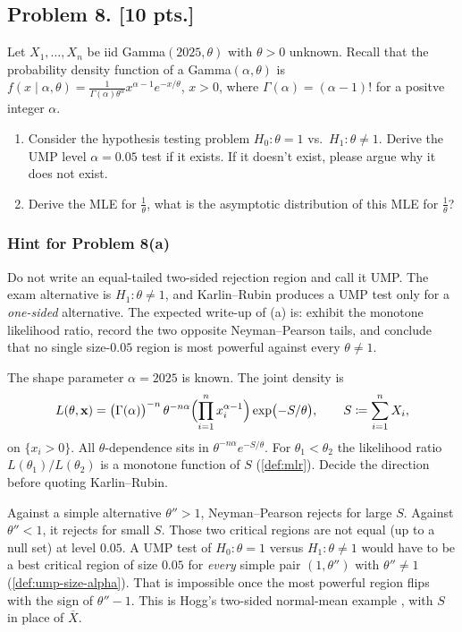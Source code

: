 \documentclass[11pt,a4paper]{article}
\begin{document}
\subsection{Problem 8. [10 pts.]}
Let \( X_1, \dots, X_n \) be iid Gamma\( (2025, \theta) \) with \( \theta > 0 \) unknown. Recall that the probability density function of a Gamma\( (\alpha, \theta) \) is \( f(x \mid \alpha, \theta) = \frac{1}{\Gamma(\alpha) \theta^\alpha} x^{\alpha-1} e^{-x/\theta} \), \( x > 0 \), where \( \Gamma(\alpha) = (\alpha - 1)! \) for a positve integer \( \alpha \).
\begin{enumerate}[label=(\alph*)]
    \item Consider the hypothesis testing problem \( H_0 : \theta = 1 \) vs.\ \( H_1 : \theta \neq 1 \). Derive the UMP level \( \alpha = 0.05 \) test if it exists. If it doesn't exist, please argue why it does not exist.
    \item Derive the MLE for \( \frac{1}{\theta} \), what is the asymptotic distribution of this MLE for \( \frac{1}{\theta} \)?
\end{enumerate}

\setcounter{section}{8}

\subsubsection{Hint for Problem 8(a)}

Do not write an equal-tailed two-sided rejection region and call it UMP. The exam alternative is \( H_1:\theta\neq 1 \), and Karlin--Rubin produces a UMP test only for a \emph{one-sided} alternative. The expected write-up of (a) is: exhibit the monotone likelihood ratio, record the two opposite Neyman--Pearson tails, and conclude that no single size-\( 0.05 \) region is most powerful against every \( \theta\neq 1 \).

The shape parameter \( \alpha=2025 \) is known. The joint density is
\[
L(\theta,\mathbf{x})
=
\bigl(\Gamma(\alpha)\bigr)^{-n}\,\theta^{-n\alpha}\Bigl(\prod_{i=1}^{n}x_i^{\alpha-1}\Bigr)\exp\bigl(-S/\theta\bigr),
\qquad
S
\coloneqq
\sum_{i=1}^{n}X_i,
\]
on \( \{x_i>0\} \). All \( \theta \)-dependence sits in \( \theta^{-n\alpha}e^{-S/\theta} \). For \( \theta_1<\theta_2 \) the likelihood ratio \( L(\theta_1)/L(\theta_2) \) is a monotone function of \( S \) (\cref{def:mlr}). Decide the direction before quoting Karlin--Rubin.

Against a simple alternative \( \theta''>1 \), Neyman--Pearson rejects for large \( S \). Against \( \theta''<1 \), it rejects for small \( S \). Those two critical regions are not equal (up to a null set) at level \( 0.05 \). A UMP test of \( H_0:\theta=1 \) versus \( H_1:\theta\neq 1 \) would have to be a best critical region of size \( 0.05 \) for \emph{every} simple pair \( (1,\theta'') \) with \( \theta''\neq 1 \) (\cref{def:ump-size-alpha}). That is impossible once the most powerful region flips with the sign of \( \theta''-1 \). This is Hogg's two-sided normal-mean example \citep[Example~8.2.3]{hogg2019}, with \( S \) in place of \( \overline{X} \).
\end{document}
